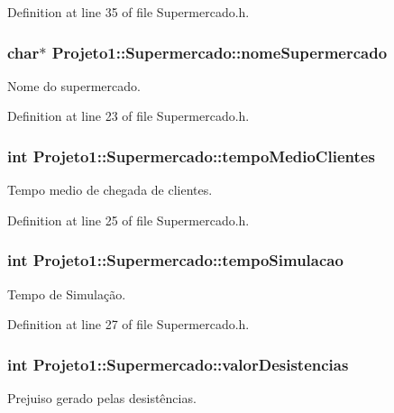 Definition at line 35 of file Supermercado.h.

\hypertarget{classProjeto1_1_1Supermercado_a05fc2f885e22cf0d109d921d0f386baa}{
\subsubsection[{nomeSupermercado}]{\setlength{\rightskip}{0pt plus 5cm}char$\ast$ {\bf Projeto1::Supermercado::nomeSupermercado}}}
\label{classProjeto1_1_1Supermercado_a05fc2f885e22cf0d109d921d0f386baa}
Nome do supermercado. 

Definition at line 23 of file Supermercado.h.

\hypertarget{classProjeto1_1_1Supermercado_a91df73523b452afac103edea5862f651}{
\subsubsection[{tempoMedioClientes}]{\setlength{\rightskip}{0pt plus 5cm}int {\bf Projeto1::Supermercado::tempoMedioClientes}}}
\label{classProjeto1_1_1Supermercado_a91df73523b452afac103edea5862f651}
Tempo medio de chegada de clientes. 

Definition at line 25 of file Supermercado.h.

\hypertarget{classProjeto1_1_1Supermercado_a6ec7501178b500d6a82330c99f95867e}{
\subsubsection[{tempoSimulacao}]{\setlength{\rightskip}{0pt plus 5cm}int {\bf Projeto1::Supermercado::tempoSimulacao}}}
\label{classProjeto1_1_1Supermercado_a6ec7501178b500d6a82330c99f95867e}
Tempo de Simulação. 

Definition at line 27 of file Supermercado.h.

\hypertarget{classProjeto1_1_1Supermercado_af210ce3a01e004c464d8abb03c74fedc}{
\subsubsection[{valorDesistencias}]{\setlength{\rightskip}{0pt plus 5cm}int {\bf Projeto1::Supermercado::valorDesistencias}}}
\label{classProjeto1_1_1Supermercado_af210ce3a01e004c464d8abb03c74fedc}
Prejuiso gerado pelas desistências. 

